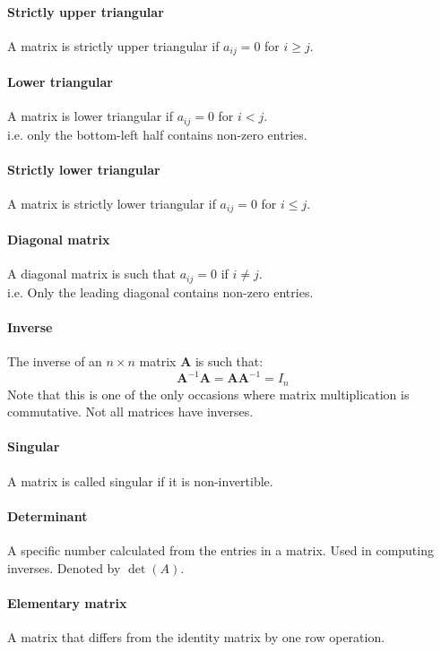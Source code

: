 \documentclass{scrartcl}
\renewcommand{\vec}[1]{\mathbf{#1}}
\begin{document}
\paragraph{Strictly upper triangular}
A matrix is strictly upper triangular if $ a_{ij} = 0 $ for $ i \geq j $.

\paragraph{Lower triangular}
A matrix is lower triangular if $ a_{ij} = 0 $ for $ i < j $.
\\
i.e. only the bottom-left half contains non-zero entries.

\paragraph{Strictly lower triangular}
A matrix is strictly lower triangular if $ a_{ij} = 0 $ for $ i \leq j $.

\paragraph{Diagonal matrix}
A diagonal matrix is such that $ a_{ij} = 0 $ if $ i \neq j $.
\\
i.e. Only the leading diagonal contains non-zero entries.

\paragraph{Inverse}
The inverse of an $ n \times n $ matrix $ \vec{A} $ is such that:
\begin{equation}
\vec{A}^{-1} \vec{A} = \vec{A} \vec{A}^{-1} = I_{n}
\end{equation}
Note that this is one of the only occasions where matrix multiplication is commutative. Not all matrices have inverses.

\paragraph{Singular}
A matrix is called singular if it is non-invertible.

\paragraph{Determinant}
A specific number calculated from the entries in a matrix. Used in computing inverses. Denoted by $ \det(A) $.

\paragraph{Elementary matrix}
A matrix that differs from the identity matrix by one row operation.
\end{document}
